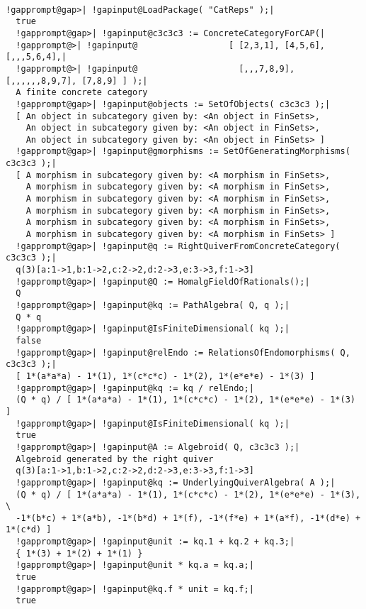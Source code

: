 \begin{computation}\phantom{}\\
\begin{Verbatim}[commandchars=!@|,fontsize=\small,frame=single,label=Example]
  !gapprompt@gap>| !gapinput@LoadPackage( "CatReps" );|
  true
  !gapprompt@gap>| !gapinput@c3c3c3 := ConcreteCategoryForCAP(|
  !gapprompt@>| !gapinput@                  [ [2,3,1], [4,5,6], [,,,5,6,4],|
  !gapprompt@>| !gapinput@                    [,,,7,8,9], [,,,,,,8,9,7], [7,8,9] ] );|
  A finite concrete category
  !gapprompt@gap>| !gapinput@objects := SetOfObjects( c3c3c3 );|
  [ An object in subcategory given by: <An object in FinSets>,
    An object in subcategory given by: <An object in FinSets>,
    An object in subcategory given by: <An object in FinSets> ]
  !gapprompt@gap>| !gapinput@gmorphisms := SetOfGeneratingMorphisms( c3c3c3 );|
  [ A morphism in subcategory given by: <A morphism in FinSets>,
    A morphism in subcategory given by: <A morphism in FinSets>,
    A morphism in subcategory given by: <A morphism in FinSets>,
    A morphism in subcategory given by: <A morphism in FinSets>,
    A morphism in subcategory given by: <A morphism in FinSets>,
    A morphism in subcategory given by: <A morphism in FinSets> ]
  !gapprompt@gap>| !gapinput@q := RightQuiverFromConcreteCategory( c3c3c3 );|
  q(3)[a:1->1,b:1->2,c:2->2,d:2->3,e:3->3,f:1->3]
  !gapprompt@gap>| !gapinput@Q := HomalgFieldOfRationals();|
  Q
  !gapprompt@gap>| !gapinput@kq := PathAlgebra( Q, q );|
  Q * q
  !gapprompt@gap>| !gapinput@IsFiniteDimensional( kq );|
  false
  !gapprompt@gap>| !gapinput@relEndo := RelationsOfEndomorphisms( Q, c3c3c3 );|
  [ 1*(a*a*a) - 1*(1), 1*(c*c*c) - 1*(2), 1*(e*e*e) - 1*(3) ]
  !gapprompt@gap>| !gapinput@kq := kq / relEndo;|
  (Q * q) / [ 1*(a*a*a) - 1*(1), 1*(c*c*c) - 1*(2), 1*(e*e*e) - 1*(3) ]
  !gapprompt@gap>| !gapinput@IsFiniteDimensional( kq );|
  true
  !gapprompt@gap>| !gapinput@A := Algebroid( Q, c3c3c3 );|
  Algebroid generated by the right quiver
  q(3)[a:1->1,b:1->2,c:2->2,d:2->3,e:3->3,f:1->3]
  !gapprompt@gap>| !gapinput@kq := UnderlyingQuiverAlgebra( A );|
  (Q * q) / [ 1*(a*a*a) - 1*(1), 1*(c*c*c) - 1*(2), 1*(e*e*e) - 1*(3), \
  -1*(b*c) + 1*(a*b), -1*(b*d) + 1*(f), -1*(f*e) + 1*(a*f), -1*(d*e) + 1*(c*d) ]
  !gapprompt@gap>| !gapinput@unit := kq.1 + kq.2 + kq.3;|
  { 1*(3) + 1*(2) + 1*(1) }
  !gapprompt@gap>| !gapinput@unit * kq.a = kq.a;|
  true
  !gapprompt@gap>| !gapinput@kq.f * unit = kq.f;|
  true
\end{Verbatim}
\end{computation}

